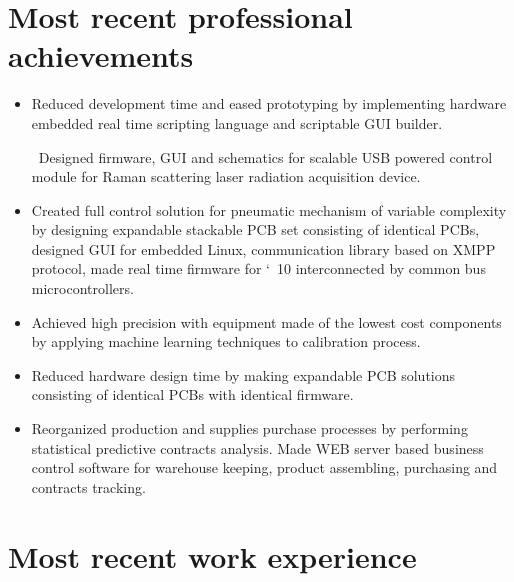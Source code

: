 \documentclass[10pt,letterpaper,oneside,sans]{moderncv}
\begin{document}
\section{Most recent professional achievements}
\begin{itemize}

\item Reduced development time and eased prototyping by implementing hardware embedded real time scripting language and scriptable GUI builder.

\ Designed firmware, GUI and schematics for scalable USB powered control module for Raman scattering laser radiation acquisition device.

\item Created full control solution for pneumatic mechanism of variable complexity by designing expandable stackable PCB set consisting of identical PCBs, designed GUI for embedded Linux, communication library based on XMPP protocol, made real time firmware for \char`~10 interconnected by common bus microcontrollers.

\item Achieved high precision with equipment made of the lowest cost components by applying machine learning techniques to calibration process.

\item Reduced hardware design time by making expandable PCB solutions consisting of identical PCBs with identical firmware.

\item Reorganized production and supplies purchase processes by performing statistical predictive contracts analysis. Made WEB server based business control software for warehouse keeping, product assembling, purchasing and contracts tracking.

\end{itemize}



\vspace*{-4mm}
\section{Most recent work experience}

\end{document}
